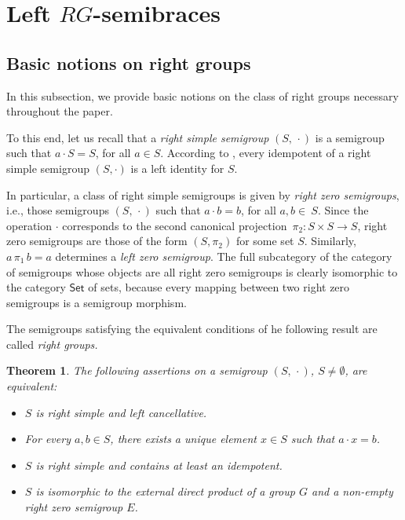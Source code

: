 \documentclass[11pt]{amsart}
\newcommand{\Set}{\mathsf{Set}}
\newtheorem{theorem}{Theorem}[section]
\newtheorem{lemma}[theorem]{Lemma}
\theoremstyle{definition}
\begin{document}
\section{Left \texorpdfstring{$RG$-}{-}semibraces}

\subsection{Basic notions on right groups}
In this subsection, we provide basic notions on the class of right groups necessary throughout the paper. 

To this end, let us recall that a \emph{right simple semigroup} $(S,\,\cdot)$ is a semigroup such that $a \cdot S=S$, for all $a\in S$.
According to \cite[Lemma~1.26]{ClPr61}, every idempotent of a right simple semigroup $(S, \cdot)$ is a left identity for $S$.

In particular, a class of right simple semigroups is given by {\em right zero semigroups}, i.e., those semigroups $(S,\,\cdot)$ %
such that $a\cdot b=b$, for all $a,b\in~S$. Since the operation $\cdot$ corresponds to the second canonical projection~$\pi_2\colon S\times S\to S$, %
right zero semigroups are those of the form $(S,\pi_2)$ for some set $S$. Similarly, $a\,\pi_1\, b=a$ determines a {\em left zero semigroup}.  
The full subcategory of the category of semigroups whose objects are all right zero semigroups is clearly isomorphic to the category $\Set$ of sets, because every mapping between two right zero semigroups is a semigroup morphism.

\smallskip




The semigroups satisfying the equivalent conditions of he following result are called {\em right groups.} 

\begin{theorem}\label{1.1}  {\rm \cite[Section~1.11, Theorem~1.27]{ClPr61}} The following assertions on a semigroup $(S,\,\cdot)$, $S\ne\emptyset$, are equivalent:
\begin{itemize}
    \item[{\rm(a)}] $S$ is right simple %
and left cancellative.
\item[{\rm(b)}] For every $a,b\in S$, there exists a unique element $x\in S$ such that $a \cdot x = b$.
\item[{\rm(c)}] $S$ is right simple and contains at least an idempotent.
\item[{\rm(d)}] $S$ is isomorphic to the external direct product of 
a group $G$ and a non-empty right zero semigroup $E$.
\end{itemize}
\end{theorem}
\end{document}
